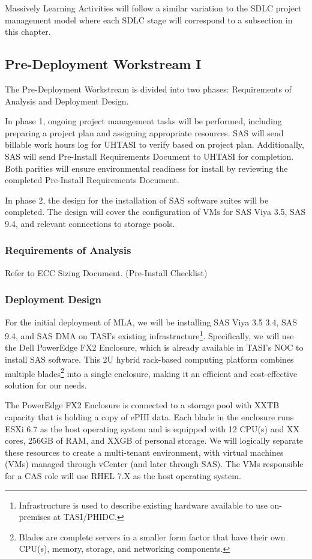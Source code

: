 Massively Learning Activities will follow a similar variation to the SDLC project management model where each SDLC stage will correspond to a subsection in this chapter. 

\subsection{Pre-Deployment Workstream I}

The Pre-Deployment Workstream is divided into two phases: Requirements of Analysis and Deployment Design. 

In phase 1, ongoing project management tasks will be performed, including preparing a project plan and assigning appropriate resources. SAS will send billable work hours log for UHTASI to verify based on project plan. Additionally, SAS will send Pre-Install Requirements Document to UHTASI for completion. Both parities will ensure environmental readiness for install by reviewing the completed Pre-Install Requirements Document. 

In phase 2, the design for the installation of SAS software suites will be completed. The design will cover the configuration of VMs for SAS Viya 3.5, SAS 9.4, and relevant connections to storage pools. 

\subsubsection{Requirements of Analysis}
Refer to ECC Sizing Document. (Pre-Install Checklist)

\subsubsection{Deployment Design}

For the initial deployment of MLA, we will be installing SAS Viya 3.5 3.4, SAS 9.4, and SAS DMA on TASI's existing infrastructure\footnote{Infrastructure is used to describe existing hardware available to use on-premises at TASI/PHIDC.}. Specifically, we will use the Dell PowerEdge FX2 Enclosure, which is already available in TASI's NOC to install SAS software. This 2U hybrid rack-based computing platform combines multiple blades\footnote{Blades are complete servers in a smaller form factor that have their own CPU(s), memory, storage, and networking components.} into a single enclosure, making it an efficient and cost-effective solution for our needs.

The PowerEdge FX2 Enclosure is connected to a storage pool with XXTB capacity that is holding a copy of ePHI data. Each blade in the enclosure runs ESXi 6.7 as the host operating system and is equipped with 12 CPU(s) and XX cores, 256GB of RAM, and XXGB of personal storage. We will logically separate these resources to create a multi-tenant environment, with virtual machines (VMs) managed through vCenter (and later through SAS). The VMs responsible for a CAS role will use RHEL 7.X as the host operating system. 

